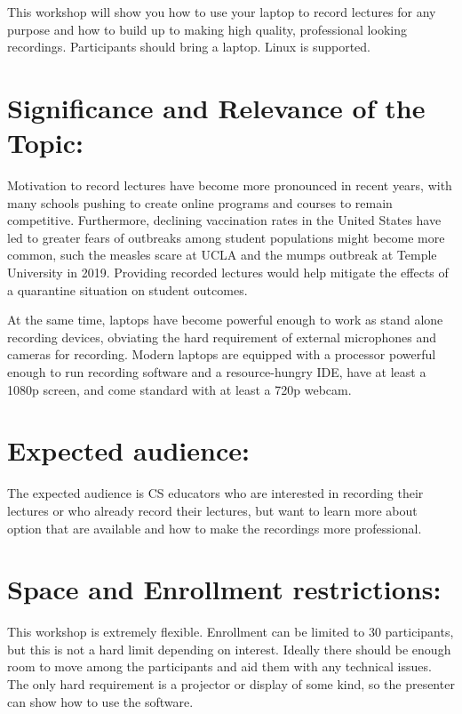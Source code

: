 \documentclass[10pt,letterpaper]{article}
\begin{document}
This workshop will show you how to use your laptop to record lectures for any purpose and how to build up to making high quality, professional looking recordings. 
Participants should bring a laptop.
Linux is supported.

\section*{Significance and Relevance of the Topic:}

Motivation to record lectures have become more pronounced in  recent years, with many schools pushing to create online programs and courses to remain competitive.
Furthermore, declining vaccination rates in the United States have led to greater fears of outbreaks among student populations might become more common, such the measles scare at UCLA  and the mumps outbreak at Temple University in 2019.
Providing recorded lectures would help mitigate the effects of a quarantine situation on student outcomes.


At the same time, laptops have become powerful enough to work as stand alone recording devices, obviating the hard requirement of external microphones and cameras for recording.
Modern laptops are equipped with a processor powerful enough to run recording software and a resource-hungry IDE, have at least a 1080p screen, and come standard with at least a 720p webcam.

\section*{Expected audience:}  The expected audience is CS educators who are interested in recording their lectures or who already record their lectures, but want to learn more about option that are available and how to make the recordings more professional.

\section*{Space and Enrollment restrictions:} 
This workshop is extremely flexible. 
Enrollment can be limited to 30 participants, but this is not a hard limit depending on interest.
Ideally there should be enough room to move among the participants and aid them with any technical issues.
The only hard requirement is a projector or display of some kind, so the presenter can show how to use the software.

\newpage
\end{document}
